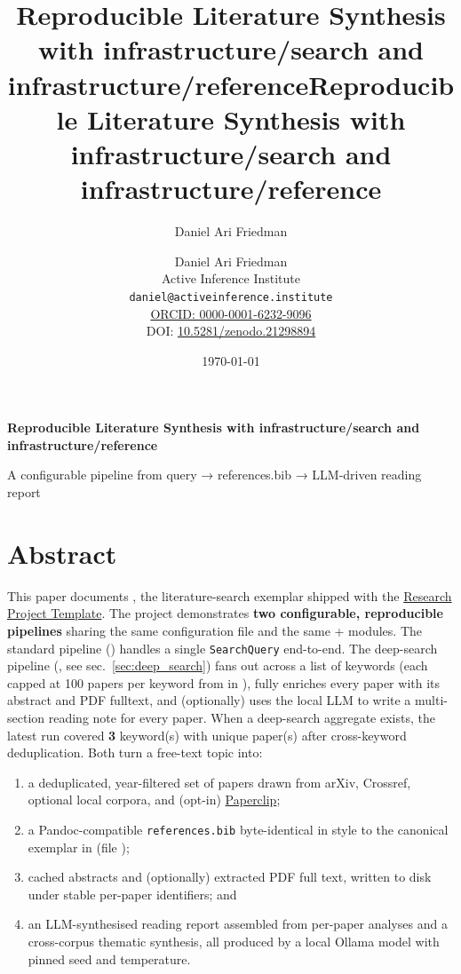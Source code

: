 \documentclass[
  english,
]{article}
\title{Reproducible Literature Synthesis with infrastructure/search and
infrastructure/reference}
\author{Daniel Ari Friedman}
\date{}
\title{Reproducible Literature Synthesis with infrastructure/search and infrastructure/reference}
\author{Daniel Ari Friedman\\\footnotesize{Active Inference Institute}\\\footnotesize{\texttt{daniel@activeinference.institute}}\\\footnotesize{\href{https://orcid.org/0000-0001-6232-9096}{ORCID: 0000-0001-6232-9096}} \\ \footnotesize{DOI: \href{https://doi.org/10.5281/zenodo.21298894}{10.5281/zenodo.21298894}}}
\date{\today}
\providecommand{\tightlist}{%
  \setlength{\itemsep}{0pt}\setlength{\parskip}{0pt}}
\begin{document}
\begin{titlepage}
\centering
\vspace*{2cm}
{\LARGE\bfseries Reproducible Literature Synthesis with infrastructure/search and infrastructure/reference\par}
\vspace{0.75em}
{\large A configurable pipeline from query → references.bib → LLM-driven reading report\par}
\vfill
\makeatletter
{\@author\par}
\vspace{1em}
{\@date\par}
\makeatother
\vfill
\end{titlepage}
\thispagestyle{empty}
\tableofcontents
\newpage

\section{Abstract}\label{sec:abstract}

This paper documents , the
literature-search exemplar shipped with the
\href{https://github.com/docxology/template}{Research Project Template}.
The project demonstrates \textbf{two configurable, reproducible
pipelines} sharing the same configuration file and the same
 + 
modules. The standard pipeline
() handles a single
\texttt{SearchQuery} end-to-end. The deep-search pipeline
(, see sec.~\ref{sec:deep_search})
fans out across a list of keywords (each capped at 100 papers per
keyword from
 in
), fully enriches every paper with its
abstract and PDF fulltext, and (optionally) uses the local LLM to write
a multi-section reading note for every paper. When a deep-search
aggregate exists, the latest run covered \textbf{3} keyword(s) with
\textbf{} unique paper(s) after cross-keyword deduplication. Both turn a
free-text topic into:

\begin{enumerate}
\def\labelenumi{\arabic{enumi}.}
\tightlist
\item
  a deduplicated, year-filtered set of papers drawn from arXiv,
  Crossref, optional local corpora, and (opt-in)
  \href{https://paperclip.gxl.ai/}{Paperclip};
\item
  a Pandoc-compatible \texttt{references.bib} byte-identical in style to
  the canonical exemplar in
  \href{../../template_code_project/manuscript/references.bib}{}
  (file );
\item
  cached abstracts and (optionally) extracted PDF full text, written to
  disk under stable per-paper identifiers; and
\item
  an LLM-synthesised reading report assembled from per-paper analyses
  and a cross-corpus thematic synthesis, all produced by a local Ollama
  model with pinned seed and temperature.
\end{enumerate}
\end{document}
